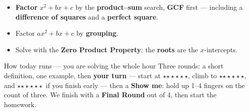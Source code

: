 \documentclass[aspectratio=169, 11pt]{beamer}
\newcommand{\rung}[1]{{\color{goldacc}\ifcase#1\or$\star$\or$\star\star$\or$\star\star\star$\fi}}
\begin{document}
\begin{frame}[t, plain]
  \begin{itemize}\setlength{\itemsep}{4pt}
    \item \textbf{Factor} $x^2+bx+c$ by the \textbf{product--sum} search, \textbf{GCF} first ---
          including a \textbf{difference of squares} and a \textbf{perfect square}.
    \item Factor $ax^2+bx+c$ by \textbf{grouping}.
    \item Solve with the \textbf{Zero Product Property}; the \textbf{roots} are the $x$-intercepts.
  \end{itemize}
  \vspace{3pt}
  \begin{block}{How today runs --- you are solving the whole hour}
    Three rounds: a short definition, one example, then \textbf{your turn} --- start at
    \rung1, climb to \rung2, and \rung3\ if you finish early --- then a \textbf{Show me}: hold up
    1--4 fingers on the count of three. We finish with a \textbf{Final Round} out of 4, then
    start the homework.
  \end{block}
\end{frame}
\end{document}
